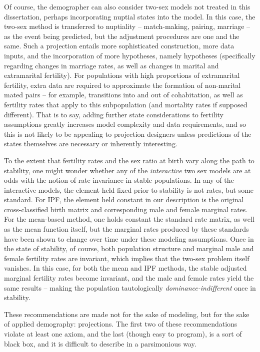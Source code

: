 Of course, the demographer can also consider two-sex models not treated
in this dissertation, perhaps incorporating nuptial states into the model. 
In this case, the two-sex method is transferred to nuptiality --
match-making, pairing, marriage -- as the event being predicted, but the
adjustment procedures are one and the same. Such a projection
entails more sophisticated construction, more data inputs, and the incorporation
of more hypotheses, namely hypotheses (specifically regarding changes in
marriage rates, as well as changes in marital and extramarital fertility). For
populations with high proportions of extramarital fertility, extra data are required to approximate the formation of
non-marital mated pairs -- for example, transitions into and out of
cohabitation, as well as fertility rates that apply to this subpopulation (and mortality
rates if supposed different). That is to say, adding further state
considerations to fertility assumptions greatly increases model complexity
and data requirements, and so this is not likely to be appealing to projection
designers unless predictions of the states themselves are necessary or
inherently interesting.

To the extent that fertility rates and the sex ratio at
birth vary along the path to stability, one might wonder whether any of the
\textit{interactive} two sex models are at odds with the notion of
rate invariance in stable populations. In any of the
interactive models, the element held fixed prior to stability is not rates, but
some standard. For IPF, the element held constant in our 
description is the original cross-classified birth matrix and corresponding 
male and female marginal rates. For the mean-based method, one holds constant 
the standard rate matrix, as well as the mean function itself, but the marginal 
rates produced by these standards have been shown to change over time
under these modeling assumptions. Once in the state of stability, of
course, both population structure and marginal male and female fertility rates are invariant, which
implies that the two-sex problem itself vanishes. In this case, for both the
mean and IPF methods, the stable adjusted marginal fertility rates become
invariant, and the male and female rates yield the same results -- making the
population tautologically \textit{dominance-indifferent} once in stability.

These recommendations are made not for the sake of modeling, but for the sake of
applied demography: projections. The first two of these recommendations
violate at least one axiom, and the last (though easy to program), is a sort of
black box, and it is difficult to describe in a parsimonious way.
